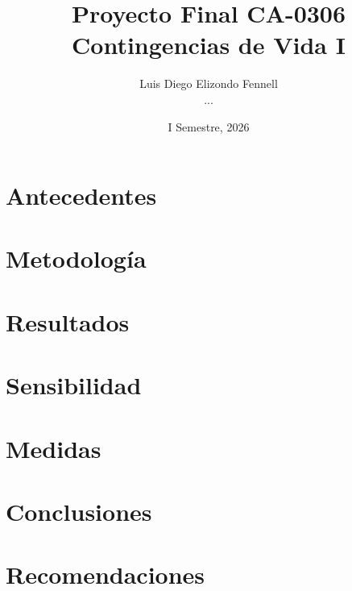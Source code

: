 \documentclass[12pt,a4paper]{article}
\title{Proyecto Final CA-0306 \\ Contingencias de Vida I}
\author{Luis Diego Elizondo Fennell \\ ...}
\date{I Semestre, 2026}
\begin{document}
\maketitle
\tableofcontents
\newpage

\section{Antecedentes}

\section{Metodología}

\section{Resultados}

\section{Sensibilidad}

\section{Medidas}

\section{Conclusiones}

\section{Recomendaciones}

\printbibliography
\end{document}
